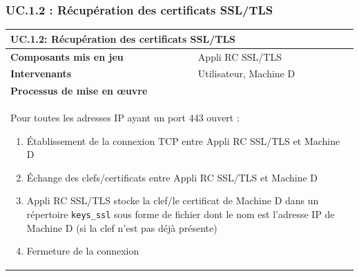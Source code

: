 \documentclass[a4paper,11pt,french]{article}
\begin{document}
\subsubsection{UC.1.2 : Récupération des certificats SSL/TLS}
\begin{center}

	\begin{tabularx}{16cm}{|l|X|}
	\hline
	\multicolumn{2}{|l|}{\textbf{UC.1.2: Récupération des certificats SSL/TLS}}\\
	\hline
	\textbf{Composants mis en jeu} & Appli RC SSL/TLS\\
	\hline
	\textbf{Intervenants} & Utilisateur, Machine D\\
	\hline
	\multicolumn{2}{|l|}{\textbf{Processus de mise en \oe uvre}}\\
	\hline
	\multicolumn{2}{|p{15cm}|}{
    Pour toutes les adresses IP ayant un port 443 ouvert :
	\begin{enumerate}
	\item Établissement de la connexion TCP entre Appli RC SSL/TLS et Machine D
	\item Échange des clefs/certificats entre Appli RC SSL/TLS et Machine D
	\item Appli RC SSL/TLS stocke la clef/le certificat de Machine D dans un répertoire \verb+keys_ssl+ sous forme de fichier dont le nom est l'adresse IP de Machine D (si la clef n'est pas déjà présente)
	\item Fermeture de la connexion
	\end{enumerate}
	}\\
	\hline
	\end{tabularx}
\end{center}
\end{document}
